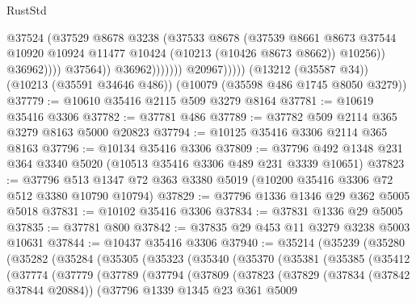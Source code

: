 \begin{lexlean}{RustStd}
\begin{coremodule}
{\begin{coremodule}
{{{{{{{{{{{{{{{{{{{{{{{{{{                                      @37524
                                      (@37529
                                        @8678
                                        @3238
                                        (@37533
                                          @8678
                                          (@37539
                                            @8661
                                            @8673
                                            @37544
                                            @10920
                                            @10924
                                            @11477
                                            @10424
                                            (@10213 (@10426 @8673 @8662))
                                            @10256))
                                        @36962))))
                                @37564))
                            @36962)))))))
              @20967)))))
    (@13212 (@35587 @34))
    (@10213 (@35591 @34646 @486))
    (@10079 (@35598 @486 @1745 @8050 @3279))
@37779 := @10610 @35416 @2115 @509 @3279 @8164
@37781 := @10619 @35416 @3306
@37782 := @37781 @486
@37789 := @37782 @509 @2114 @365 @3279 @8163 @5000 @20823
@37794 := @10125 @35416 @3306 @2114 @365 @8163
@37796 := @10134 @35416 @3306
@37809 := @37796 @492 @1348 @231 @364 @3340 @5020 (@10513 @35416 @3306 @489 @231 @3339 @10651)
@37823 := @37796 @513 @1347 @72 @363 @3380 @5019 (@10200 @35416 @3306 @72 @512 @3380 @10790 @10794)
@37829 := @37796 @1336 @1346 @29 @362 @5005 @5018
@37831 := @10102 @35416 @3306
@37834 := @37831 @1336 @29 @5005
@37835 := @37781 @800
@37842 := @37835 @29 @453 @11 @3279 @3238 @5003 @10631
@37844 := @10437 @35416 @3306
@37940 := @35214
    (@35239
      (@35280
        (@35282
          (@35284
            (@35305
              (@35323
                (@35340
                  (@35370
                    (@35381
                      (@35385
                        (@35412
                          (@37774
                            (@37779
                              (@37789
                                (@37794
                                  (@37809
                                    (@37823
                                      (@37829
                                        (@37834 (@37842 @37844 @20884))
                                        (@37796
                                          @1339
                                          @1345
                                          @23
                                          @361
                                          @5009
}}}}}}}}}}}}}}}}}}}}}}}}}}
\end{coremodule}}
\end{coremodule}
\end{lexlean}

